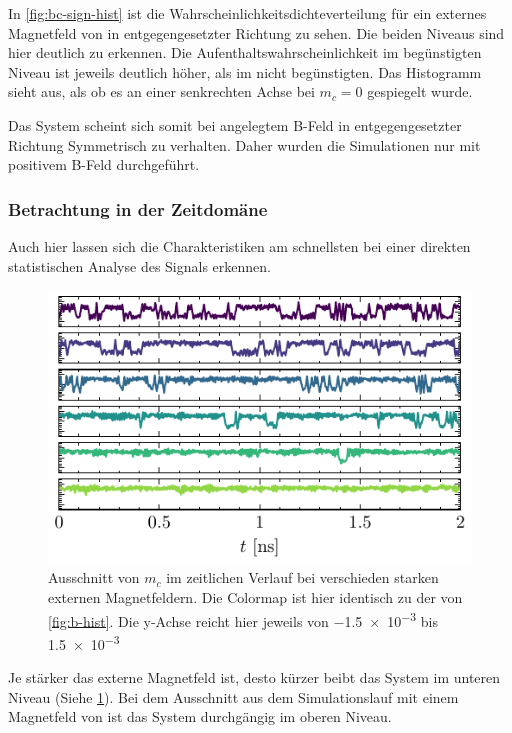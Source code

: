 \documentclass[main.tex]{subfiles}
\begin{document}
In \cref{fig:bc-sign-hist} ist die Wahrscheinlichkeitsdichteverteilung für ein externes Magnetfeld von  in entgegengesetzter Richtung zu sehen. Die beiden Niveaus sind hier deutlich zu erkennen. Die Aufenthaltswahrscheinlichkeit im begünstigten Niveau ist jeweils deutlich höher, als im nicht begünstigten. Das Histogramm sieht aus, als ob es an einer senkrechten Achse bei \(m_c=0\) gespiegelt wurde.

Das System scheint sich somit bei angelegtem B-Feld in entgegengesetzter Richtung Symmetrisch zu verhalten. Daher wurden die Simulationen nur mit positivem B-Feld durchgeführt.


\subsubsection{Betrachtung in der Zeitdomäne}

Auch hier lassen sich die Charakteristiken am schnellsten bei einer direkten statistischen Analyse des Signals erkennen.

\begin{figure}[H]
    \centering
    \includegraphics{bilder/plots/max_Bz/mc_time.pdf}
    \caption[Ausschnitt von \(m_c\) im zeitlichen Verlauf bei verschieden starken externen Magnetfeldern.]{Ausschnitt von \(m_c\) im zeitlichen Verlauf bei verschieden starken externen Magnetfeldern. Die Colormap ist hier identisch zu der von \cref{fig:b-hist}. Die y-Achse reicht hier jeweils von \num{-1.5e-3} bis \num{+1.5e-3}}\label{fig:b-time}    
\end{figure}

Je stärker das externe Magnetfeld ist, desto kürzer beibt das System im unteren Niveau (Siehe \cref{fig:b-time}). 
Bei dem Ausschnitt aus dem Simulationslauf mit einem Magnetfeld von  ist das System durchgängig im oberen Niveau.
\end{document}
